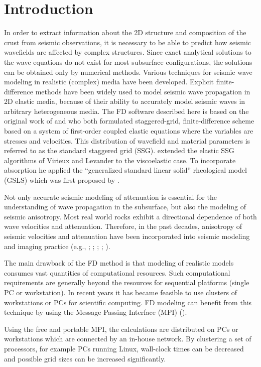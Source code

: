 \section{Introduction}
\label{intro}
In order to extract information about the 2D structure and composition of the crust from seismic observations, it is necessary to be able to predict how seismic wavefields are affected by complex structures. Since exact analytical solutions to the wave equations do not exist for most subsurface configurations, the solutions can be obtained only by numerical methods. Various techniques for seismic wave modeling in realistic (complex) media have been developed. Explicit finite-difference methods have been widely used to model seismic wave propagation in 2D elastic media, because of their ability to accurately model seismic waves in arbitrary heterogeneous media. The FD software described here is based on the original work of \citet{virieux:86} and \citet{levander:88} who both formulated staggered-grid, finite-difference scheme based on a system of first-order coupled elastic equations where the variables are stresses and velocities. This distribution of wavefield and material parameters is referred to as the standard staggered grid (SSG). \citet{robertsson:94} extended the elastic SSG algorithms of Virieux and Levander to the viscoelastic case. To incorporate absorption he applied the \enquote{generalized standard linear solid} rheological model (GSLS) which was first proposed by \citet{emmerich:87}.

Not only accurate seismic modeling of attenuation is essential for the understanding of wave propagation in the subsurface, but also the modeling of seismic anisotropy. Most real world rocks exhibit a directional dependence of both wave velocities and attenuation. Therefore, in the past decades, anisotropy of seismic velocities and attenuation have been incorporated into seismic modeling and imaging practice (e.g., \cite{Carcione:88}; \cite{Komatitisch:99}; \cite{Thomsen:86}; \cite{Tsvankin:12}; \cite{Bai:16}).

The main drawback of the FD method is that modeling of realistic models consumes vast quantities of computational resources. Such computational requirements are generally beyond the resources for sequential platforms (single PC or workstation). In recent years it has became feasible to use clusters of workstations or PCs for scientific computing. FD modeling can benefit from this technique by using the Message Passing Interface (MPI) (\cite{bohlen:02}). 

Using the free and portable MPI, the calculations are distributed on PCs or workstations which are connected by an in-house network. By clustering a set of processors, for example PCs running Linux, wall-clock times can be decreased and possible grid sizes  can be increased significantly. 